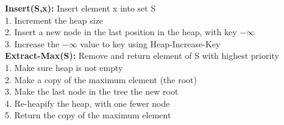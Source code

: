 \documentclass[a4paper]{extarticle}
\begin{document}
\begin{paracol}{3}
{\begin{minipage}[t]{1\linewidth}
{      \textbf{Insert(S,x):} Insert element x into set S\\
      1. Increment the heap size\\
      2. Insert a new node in the last position in the heap, with key $-\infty$\\
      3. Increase the $-\infty$ value to key using Heap-Increase-Key\\
      
      \textbf{Extract-Max(S):} Remove and return element of S with highest priority\\
      1. Make sure heap is not empty\\
      2. Make a copy of the maximum element (the root)\\
      3. Make the last node in the tree the new root\\
      4. Re-heapify the heap, with one fewer node\\
      5. Return the copy of the maximum element\\
      
}
\end{minipage}}
\end{paracol}
\end{document}
